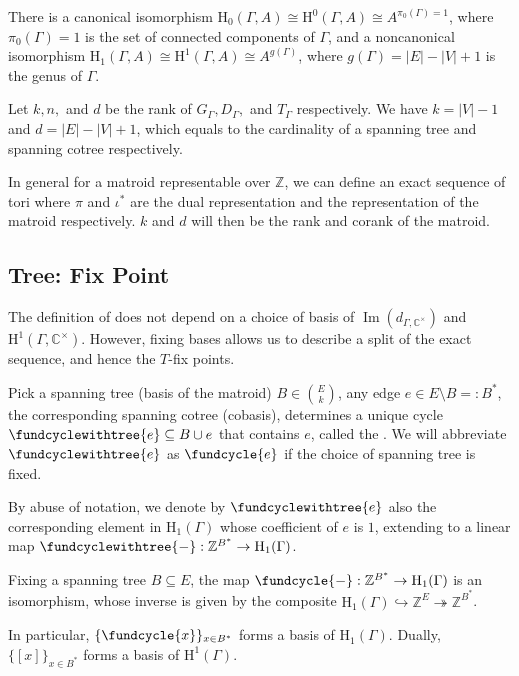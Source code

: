 \documentclass[b5paper]{article}
\newcommand{\ZZ}{\mathbb{Z}}
\newcommand{\del}{\setminus}
\newcommand{\HH}{\mathrm{H}}
\renewcommand{\im}{\operatorname{Im}}
\begin{document}
There is a canonical isomorphism $\HH_0(\Gamma, A) \cong \HH^0(\Gamma, A) \cong A^{\pi_0(\Gamma)=1} $, where $\pi_0(\Gamma)=1$ is the set of connected components of $\Gamma$, and a noncanonical isomorphism $ \HH_1(\Gamma, A) \cong \HH^1(\Gamma, A) \cong A^{g(\Gamma)} $, where $g(\Gamma)=|E|-|V|+1$ is the genus of $\Gamma$.

Let $k,n,$ and $d$ be the rank of $G_\Gamma,D_\Gamma,$ and $T_\Gamma$ respectively. We have $k=|V|-1$ and $d=|E|-|V|+1$, which equals to the cardinality of a spanning tree and spanning cotree respectively. 

In general for a matroid representable over $\mathbb{Z}$, we can define an exact sequence of tori where $\pi$ and $\iota^*$ are the dual representation and the representation of the matroid respectively. $k$ and $d$ will then be the rank and corank of the matroid.

\subsection{Tree: Fix Point}

The definition of  does not depend on a choice of basis of $\im(d_{\Gamma,\mathbb{C}^\times })$ and $\HH^1(\Gamma,\mathbb{C}^\times )$. However, fixing bases allows us to describe a split of the exact sequence, and hence the $T$-fix points.

\begin{definition}[def:]{}
  Pick a spanning tree (basis of the matroid) $B\in \binom{E}{k}$, any edge $e\in E\del B=:B^*$, the corresponding spanning cotree (cobasis), determines a unique cycle $\fundcyclewithtree{e}\subseteq B\cup e$ that contains $e$, called the .
  We will abbreviate $\fundcyclewithtree{e}$ as $\fundcycle{e}$ if the choice of spanning tree is fixed.
\end{definition}
By abuse of notation, we denote by $\fundcyclewithtree{e}$ also the corresponding element in $\HH_1(\Gamma)$ whose coefficient of $e$ is $1$, extending to a linear map $ \fundcyclewithtree{-} : \ZZ^{B^*} \to \HH_1(\Gamma) $.

\begin{theorem}{}
  Fixing a spanning tree $B \subseteq E$, the map $ \fundcycle{-}: \ZZ^{B^*} \to \HH_1(\Gamma) $ is an isomorphism, whose inverse is given by the composite $ \HH_1(\Gamma) \hookrightarrow \ZZ^E \twoheadrightarrow \ZZ^{B^*} $.
  \begin{remark}
    In particular, $\{\fundcycle{x}\}_{x \in B^*}$ forms a basis of $\HH_1(\Gamma)$. Dually, $\{[x]\}_{x \in B^*}$ forms a basis of $\HH^1(\Gamma)$.
  \end{remark}
\end{theorem}
\end{document}
